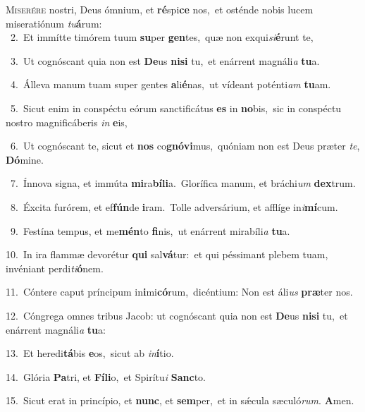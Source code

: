 \lettrine{\initial\textcolor{\initialcolor}{M}}{iserére} nostri, Deus ómnium, et \textbf{ré}\-spi\textbf{ce} nos,~\star et osténde nobis lucem miseratiónum \textit{tu}\-\textbf{á}rum:\\
{\numbfont\textcolor{\numbcolor}{~2.}}~Et immítte timórem tuum \textbf{su}\-per \textbf{gen}\-tes,~\star quæ non exqui\-\textit{si}\-\textbf{é}runt te,\par
{\numbfont\textcolor{\numbcolor}{~3.}}~Ut cognóscant quia non est \textbf{De}\-us \textbf{ni}\-\textbf{si} tu,~\star et enárrent magnáli\textit{a} \textbf{tu}\-a.\par
{\numbfont\textcolor{\numbcolor}{~4.}}~Álleva manum tuam super gentes \textbf{a}\-li\-\textbf{é}\-nas,~\star ut vídeant poténti\textit{am} \textbf{tu}\-am.\par
{\numbfont\textcolor{\numbcolor}{~5.}}~Sicut enim in conspéctu eórum sanctificátus \textbf{es} in \textbf{no}\-bis,~\star sic in conspéctu nostro magnificáberis \textit{in} \textbf{e}\-is,\par
{\numbfont\textcolor{\numbcolor}{~6.}}~Ut cognóscant te, sicut et \textbf{nos} co\-\textbf{gnó}\-\textbf{vi}mus,~\star quóniam non est Deus præter \textit{te}\-, \textbf{Dó}\-mine.\par
{\numbfont\textcolor{\numbcolor}{~7.}}~Ínnova signa, et immúta \textbf{mi}\-ra\-\textbf{bí}\-\textbf{li}a.~\star Glorífica manum, et bráchi\textit{um} \textbf{dex}\-trum.\par
{\numbfont\textcolor{\numbcolor}{~8.}}~Éxcita furórem, et ef\-\textbf{fún}\-de \textbf{i}\-ram.~\star Tolle adversárium, et afflíge in\-\textit{i}\-\textbf{mí}cum.\par
{\numbfont\textcolor{\numbcolor}{~9.}}~Festína tempus, et me\-\textbf{mén}\-to \textbf{fi}\-nis,~\star ut enárrent mirabíli\textit{a} \textbf{tu}\-a.\par
{\numbfont\textcolor{\numbcolor}{10.}}~In ira flammæ devorétur \textbf{qui} sal\-\textbf{vá}\-tur:~\star et qui péssimant plebem tuam, invéniant perdi\-\textit{ti}\-\textbf{ó}nem.\par
{\numbfont\textcolor{\numbcolor}{11.}}~Cóntere caput príncipum in\-\textbf{i}\-mi\-\textbf{có}\-rum,~\star dicéntium: Non est áli\textit{us} \textbf{præ}\-ter nos.\par
{\numbfont\textcolor{\numbcolor}{12.}}~Cóngrega omnes tribus Jacob: ut cognóscant quia non est \textbf{De}\-us \textbf{ni}\-\textbf{si} tu,~\star et enárrent magnáli\textit{a} \textbf{tu}\-a:\par
{\numbfont\textcolor{\numbcolor}{13.}}~Et heredi\-\textbf{tá}\-bis \textbf{e}\-os,~\star sicut ab \textit{in}\-\textbf{í}tio.\par
{\numbfont\textcolor{\numbcolor}{14.}}~Glória \textbf{Pa}\-tri, et \textbf{Fí}\-\textbf{li}o,~\star et Spirítu\textit{i} \textbf{Sanc}\-to.\par
{\numbfont\textcolor{\numbcolor}{15.}}~Sicut erat in princípio, et \textbf{nunc}\-, et \textbf{sem}\-per,~\star et in sǽcula sæculó\-\textit{rum}\-. \textbf{A}\-men.\par
